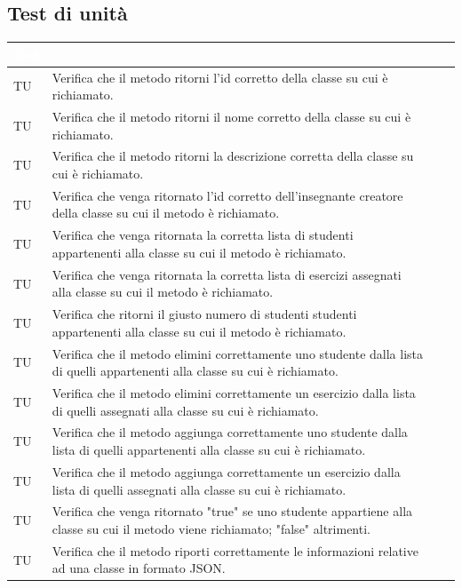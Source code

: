 \subsection{Test di unità}
\begin{longtable}{|>{\centering\arraybackslash}m{1.6cm}|>{\centering\arraybackslash}m{6.41cm}|>{\centering\arraybackslash}m{3.1cm}| c |}		
		\rowcolor{LightBlue}
		\textbf{\textcolor{white}{Test}}
		& \multicolumn{1}{|c|}{\textbf{\textcolor{white}{ Descrizione}}}\\
		\hline
		TU & Verifica che il metodo ritorni l'id corretto della classe su cui è richiamato. \\ \hline
		TU & Verifica che il metodo ritorni il nome corretto della classe su cui è richiamato. \\ \hline
		TU & Verifica che il metodo ritorni la descrizione corretta della classe su cui è richiamato.\\ \hline
		TU & Verifica che venga ritornato l'id corretto dell'insegnante creatore della classe su cui il metodo è richiamato. \\ \hline
		TU & Verifica che venga ritornata la corretta lista di studenti appartenenti alla classe su cui il metodo è richiamato.  \\ \hline
		TU & Verifica che venga ritornata la corretta lista di esercizi assegnati alla classe su cui il metodo è richiamato.\\ \hline
		TU & Verifica che ritorni il giusto numero di studenti studenti appartenenti alla classe su cui il metodo è richiamato.  \\ \hline
		TU & Verifica che il metodo elimini correttamente uno studente dalla lista di quelli appartenenti alla classe su cui è  richiamato.  \\ \hline
		TU & Verifica che il metodo elimini correttamente un esercizio dalla lista di quelli assegnati alla classe su cui è  richiamato.\\ \hline
		TU & Verifica che il metodo aggiunga correttamente uno studente dalla lista di quelli appartenenti alla classe su cui è  richiamato.\\ \hline
		TU & Verifica che il metodo aggiunga correttamente un esercizio dalla lista di quelli assegnati alla classe su cui è  richiamato. \\ \hline
		TU & Verifica che venga ritornato "true" se uno studente appartiene alla classe su cui il metodo viene richiamato; "false" altrimenti.  \\ \hline	
		TU & Verifica che il metodo riporti correttamente le informazioni relative ad una classe in formato JSON. \\ \hline	

\end{longtable}
